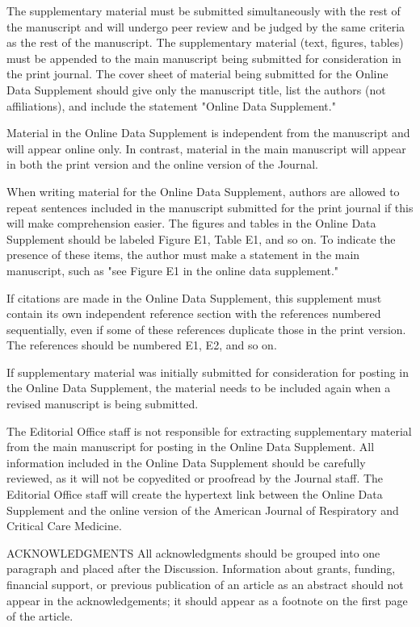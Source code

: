 The supplementary material must be submitted simultaneously with the rest of the manuscript and will undergo peer review and be judged by the same criteria as the rest of the manuscript. The supplementary material (text, figures, tables) must be appended to the main manuscript being submitted for consideration in the print journal. The cover sheet of material being submitted for the Online Data Supplement should give only the manuscript title, list the authors (not affiliations), and include the statement "Online Data Supplement."

Material in the Online Data Supplement is independent from the manuscript and will appear online only. In contrast, material in the main manuscript will appear in both the print version and the online version of the Journal.

When writing material for the Online Data Supplement, authors are allowed to repeat sentences included in the manuscript submitted for the print journal if this will make comprehension easier. The figures and tables in the Online Data Supplement should be labeled Figure E1, Table E1, and so on. To indicate the presence of these items, the author must make a statement in the main manuscript, such as "see Figure E1 in the online data supplement."

If citations are made in the Online Data Supplement, this supplement must contain its own independent reference section with the references numbered sequentially, even if some of these references duplicate those in the print version. The references should be numbered E1, E2, and so on.

If supplementary material was initially submitted for consideration for posting in the Online Data Supplement, the material needs to be included again when a revised manuscript is being submitted.

The Editorial Office staff is not responsible for extracting supplementary material from the main manuscript for posting in the Online Data Supplement. All information included in the Online Data Supplement should be carefully reviewed, as it will not be copyedited or proofread by the Journal staff. The Editorial Office staff will create the hypertext link between the Online Data Supplement and the online version of the American Journal of Respiratory and Critical Care Medicine.

ACKNOWLEDGMENTS
All acknowledgments should be grouped into one paragraph and placed after the Discussion. Information about grants, funding, financial support, or previous publication of an article as an abstract should not appear in the acknowledgements; it should appear as a footnote on the first page of the article.

